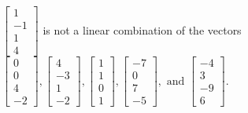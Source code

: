 \begin{exercise}
\begin{exerciseStatement}
  \end{exerciseStatement}
  \begin{exerciseAnswer}
   \(\left[\begin{array}{c}
1 \\
-1 \\
1 \\
4
\end{array}\right]\) 
  	 is not  
	a linear combination of the vectors \(\left[\begin{array}{c}
0 \\
0 \\
4 \\
-2
\end{array}\right] , \left[\begin{array}{c}
4 \\
-3 \\
1 \\
-2
\end{array}\right] , \left[\begin{array}{c}
1 \\
1 \\
0 \\
1
\end{array}\right] , \left[\begin{array}{c}
-7 \\
0 \\
7 \\
-5
\end{array}\right] , \text{ and } \left[\begin{array}{c}
-4 \\
3 \\
-9 \\
6
\end{array}\right]\).

	
  


  \end{exerciseAnswer}
\end{exercise}